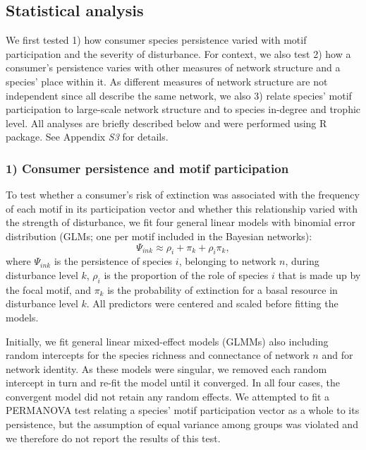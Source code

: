 \documentclass[12pt]{article}
\begin{document}
\begin{spacing}{2.0}
	\subsection*{Statistical analysis} 

        We first tested 1) how consumer species persistence varied with motif participation and the severity of disturbance.
        For context, we also test 2) how a consumer's persistence varies with other measures of network structure and a species' place within it.
        As different measures of network structure are not independent since all describe the same network, we also 3) relate species' motif participation to large-scale network structure and to species in-degree and trophic level.
        All analyses are briefly described below and were performed using  R~\citep{R} package.%
        See Appendix \emph{S3} for details. 

        
        \subsubsection*{1) Consumer persistence and motif participation}

            To test whether a consumer's risk of extinction was associated with the frequency of each motif in its participation vector and whether this relationship varied with the strength of disturbance, we fit four general linear models with binomial error distribution (GLMs; one per motif included in the Bayesian networks):
            \begin{equation}
            \Psi_{ink} \approx \rho_{i} + \pi_{k} + \rho_{i}\pi_{k} ,
            \label{propreq}
            \end{equation}
            \noindent where $\Psi_{ink}$ is the persistence of species $i$, belonging to network $n$, during disturbance level $k$, $\rho_{i}$ is the proportion of the role of species $i$ that is made up by the focal motif, and $\pi_k$ is the probability of extinction for a basal resource in disturbance level $k$.
            All predictors were centered and scaled before fitting the models.         

            
            
            Initially, we fit general linear mixed-effect models (GLMMs) also including random  intercepts for the species richness and connectance of network $n$ and for network identity.
            As these models were singular, we removed each random intercept in turn and re-fit the model until it converged.
            In all four cases, the convergent model did not retain any random effects.
            We attempted to fit a PERMANOVA test relating a species' motif participation vector as a whole to its persistence, but the assumption of equal variance among groups was violated and we therefore do not report the results of this test.
            

\end{spacing}
\end{document}
